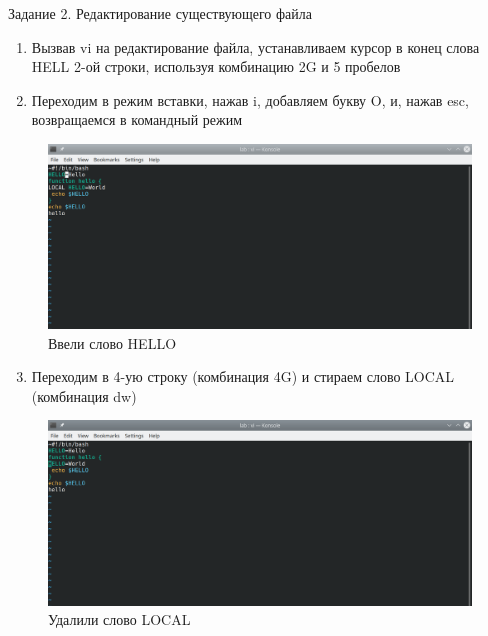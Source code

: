 \begin{frame}{Задание 2. Редактирование существующего файла}
\begin{enumerate}
\item
  Вызвав vi на редактирование файла, устанавливаем курсор в конец слова
  HELL 2-ой строки, используя комбинацию 2G и 5 пробелов
\item
  Переходим в режим вставки, нажав i, добавляем букву O, и, нажав esc,
  возвращаемся в командный режим
\end{enumerate}

\begin{figure}
\hypertarget{fig:005}{%
\centering
\includegraphics[width=1\textwidth,height=\textheight]{image/5.png}
\caption{Ввели слово HELLO}\label{fig:005}
}
\end{figure}

\begin{enumerate}
\setcounter{enumi}{2}
\tightlist
\item
  Переходим в 4-ую строку (комбинация 4G) и стираем слово LOCAL
  (комбинация dw)
\end{enumerate}

\begin{figure}
\hypertarget{fig:006}{%
\centering
\includegraphics[width=1\textwidth,height=\textheight]{image/6.png}
\caption{Удалили слово LOCAL}\label{fig:006}
}
\end{figure}


\end{frame}
